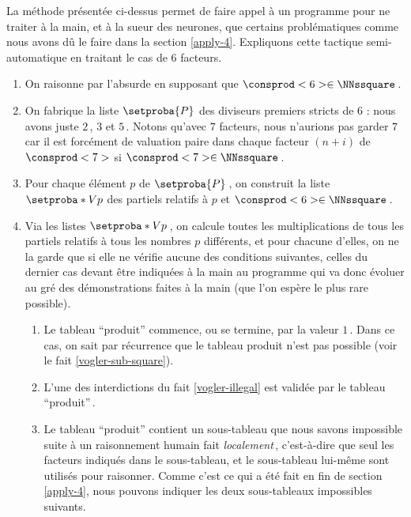 La méthode présentée ci-dessus permet de faire appel à un programme pour ne traiter à la main, et à la sueur des neurones, que certains \sftab[x] problématiques comme nous avons dû le faire dans la section \ref{apply-4}.
Expliquons cette tactique semi-automatique en traitant le cas de $6$ facteurs.


\begin{enumerate}
	\item On raisonne par l'absurde en supposant que $\consprod<6> \in \NNssquare$\,.
	
 
	\item On fabrique la liste $\setproba{P}$ des diviseurs premiers stricts de $6$ : nous avons juste $2$\,, $3$ et $5$\,.
	Notons qu'avec $7$ facteurs, nous n'aurions pas garder $7$ car il est forcément de valuation paire dans chaque facteur $(n + i)$ de $\consprod<7>$ si $\consprod<7> \in \NNssquare$\,.
	
 
	\item Pour chaque élément $p$ de $\setproba{P}$\,, on construit la liste $\setproba*{V}{p}$ des \sftab[x] partiels relatifs à $p$ et $\consprod<6> \in \NNssquare$\,.
	
 
	\item Via les listes $\setproba*{V}{p}$\,, on calcule toutes les multiplications de tous les \sftab[x] partiels relatifs à tous les nombres $p$ différents, et pour chacune d'elles, on ne la garde que si elle ne vérifie aucune des conditions suivantes, celles du dernier cas devant être indiquées à la main au programme qui va donc évoluer au gré des démonstrations faites à la main (que l'on espère le plus rare possible).
	\begin{enumerate}
		\item Le tableau \enquote{produit} commence, ou se termine, par la valeur $1$\,. Dans ce cas, on sait par récurrence que le tableau produit n'est pas possible (voir le fait \ref{vogler-sub-square}). 

		\item L'une des interdictions du fait \ref{vogler-illegal} est validée par le tableau \enquote{produit}\,.
		
		\item Le tableau \enquote{produit} contient un sous-tableau que nous savons impossible suite à un raisonnement humain fait \emph{localement}\,, c'est-à-dire que seul les facteurs indiqués dans le sous-tableau, et le sous-tableau lui-même sont utilisés pour raisonner.
		Comme c'est ce qui a été fait en fin de section \ref{apply-4}, nous pouvons indiquer les deux sous-tableaux impossibles suivants.
	\end{enumerate}
\end{enumerate}

